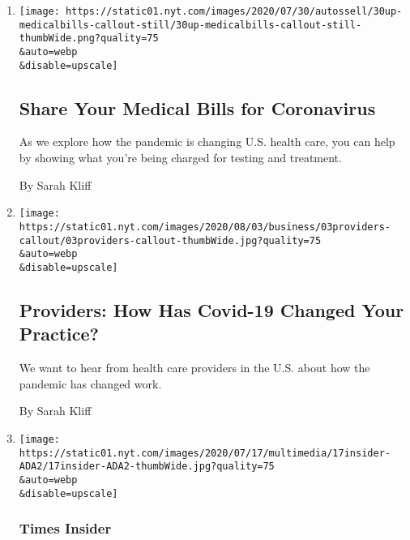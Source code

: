 \begin{enumerate}
\def\labelenumi{\arabic{enumi}.}
\item
  \href{/2020/08/03/reader-center/coronavirus-medical-bills.html}{}

  \texttt{[image: https://static01.nyt.com/images/2020/07/30/autossell/30up-medicalbills-callout-still/30up-medicalbills-callout-still-thumbWide.png?quality=75\\\&auto=webp\\\&disable=upscale]}

  \hypertarget{share-your-medical-bills-for-coronavirus}{%
  \subsection{Share Your Medical Bills for
  Coronavirus}\label{share-your-medical-bills-for-coronavirus}}

  As we explore how the pandemic is changing U.S. health care, you can
  help by showing what you're being charged for testing and treatment.

  By Sarah Kliff
\item
  \href{/2020/08/03/reader-center/healthcare-workers-coronavirus-care.html}{}

  \texttt{[image: https://static01.nyt.com/images/2020/08/03/business/03providers-callout/03providers-callout-thumbWide.jpg?quality=75\\\&auto=webp\\\&disable=upscale]}

  \hypertarget{providers-how-has-covid-19-changed-your-practice}{%
  \subsection{Providers: How Has Covid-19 Changed Your
  Practice?}\label{providers-how-has-covid-19-changed-your-practice}}

  We want to hear from health care providers in the U.S. about how the
  pandemic has changed work.

  By Sarah Kliff
\item
  \href{/2020/07/20/insider/disability-ADA.html}{}

  \texttt{[image: https://static01.nyt.com/images/2020/07/17/multimedia/17insider-ADA2/17insider-ADA2-thumbWide.jpg?quality=75\\\&auto=webp\\\&disable=upscale]}

  \hypertarget{times-insider-4}{%
  \subsubsection{Times Insider}\label{times-insider-4}}

  \hypertarget{exploring-what-disability-means-today-and-could-mean-tomorrow}{%
}
\end{enumerate}
